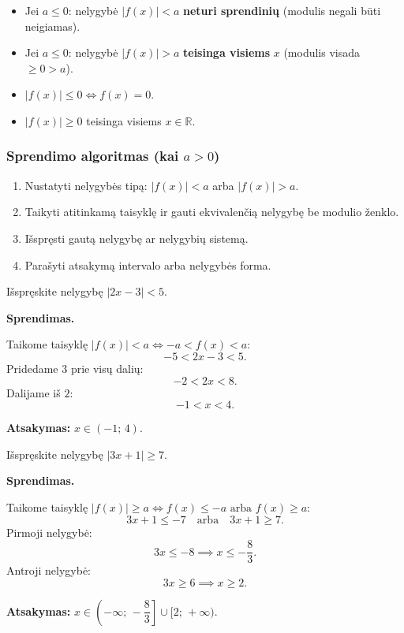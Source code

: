 \begin{tcolorbox}[title=Ypatingi atvejai, colback=yellow!10, colframe=orange!70]
\begin{itemize}
  \item Jei $a \leq 0$: nelygybė $|f(x)| < a$ \textbf{neturi sprendinių} (modulis negali būti neigiamas).
  \item Jei $a \leq 0$: nelygybė $|f(x)| > a$ \textbf{teisinga visiems} $x$ (modulis visada $\geq 0 > a$).
  \item $|f(x)| \leq 0 \iff f(x) = 0$.
  \item $|f(x)| \geq 0$ teisinga visiems $x \in \mathbb{R}$.
\end{itemize}
\end{tcolorbox}

\subsubsection*{Sprendimo algoritmas (kai $a > 0$)}

\begin{enumerate}
  \item Nustatyti nelygybės tipą: $|f(x)| < a$ arba $|f(x)| > a$.
  \item Taikyti atitinkamą taisyklę ir gauti ekvivalenčią nelygybę be modulio ženklo.
  \item Išspręsti gautą nelygybę ar nelygybių sistemą.
  \item Parašyti atsakymą intervalo arba nelygybės forma.
\end{enumerate}

\begin{example}
Išspręskite nelygybę $|2x - 3| < 5$.

\textbf{Sprendimas.}

Taikome taisyklę $|f(x)| < a \iff -a < f(x) < a$:
\[
-5 < 2x - 3 < 5.
\]
Pridedame $3$ prie visų dalių:
\[
-2 < 2x < 8.
\]
Dalijame iš $2$:
\[
-1 < x < 4.
\]

\textbf{Atsakymas:} $x \in (-1;\, 4)$.
\end{example}

\begin{example}
Išspręskite nelygybę $|3x + 1| \geq 7$.

\textbf{Sprendimas.}

Taikome taisyklę $|f(x)| \geq a \iff f(x) \leq -a \text{ arba } f(x) \geq a$:
\[
3x + 1 \leq -7 \quad \text{arba} \quad 3x + 1 \geq 7.
\]
Pirmoji nelygybė:
\[
3x \leq -8 \implies x \leq -\frac{8}{3}.
\]
Antroji nelygybė:
\[
3x \geq 6 \implies x \geq 2.
\]

\textbf{Atsakymas:} $x \in \left(-\infty;\, -\dfrac{8}{3}\right] \cup [2;\, +\infty)$.
\end{example}

